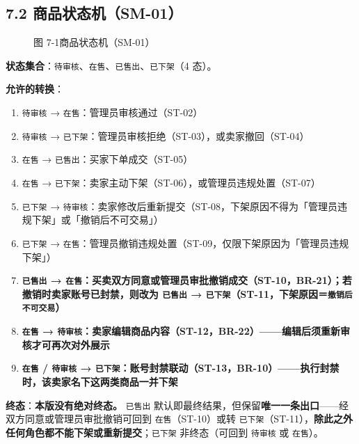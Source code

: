 \documentclass[12pt,a4paper]{ctexart}
\begin{document}
\subsection*{7.2 商品状态机（SM-01）}
\begin{figure}[htbp]
\centering
{}
\caption*{图 7-1\quad 商品状态机（SM-01）}
\label{fig:sm01}
\end{figure}


\textbf{状态集合}：\texttt{待审核}、\texttt{在售}、\texttt{已售出}、\texttt{已下架}（4 态）。


\textbf{允许的转换}：


\begin{enumerate}[leftmargin=1.9em,itemsep=1pt,topsep=2pt]
\item \texttt{待审核} → \texttt{在售}：管理员审核通过（ST-02）
\item \texttt{待审核} → \texttt{已下架}：管理员审核拒绝（ST-03），或卖家撤回（ST-04）
\item \texttt{在售} → \texttt{已售出}：买家下单成交（ST-05）
\item \texttt{在售} → \texttt{已下架}：卖家主动下架（ST-06），或管理员违规处置（ST-07）
\item \texttt{已下架} → \texttt{待审核}：卖家修改后重新提交（ST-08，下架原因不得为「管理员违规下架」或「撤销后不可交易」）
\item \texttt{已下架} → \texttt{在售}：管理员撤销违规处置（ST-09，仅限下架原因为「管理员违规下架」）
\item \textbf{\texttt{已售出} → \texttt{在售}：买卖双方同意或管理员审批撤销成交（ST-10，BR-21）；若撤销时卖家账号已封禁，则改为 \texttt{已售出} → \texttt{已下架}（ST-11，下架原因＝\texttt{撤销后不可交易}）}
\item \textbf{\texttt{在售} → \texttt{待审核}：卖家编辑商品内容（ST-12，BR-22）——编辑后须重新审核才可再次对外展示}
\item \textbf{\texttt{在售} / \texttt{待审核} → \texttt{已下架}：账号封禁联动（ST-13，BR-10）——执行封禁时，该卖家名下这两类商品一并下架}
\end{enumerate}

\textbf{终态}：\textbf{本版没有绝对终态。} \texttt{已售出} 默认即最终结果，但保留\textbf{唯一一条出口}——经双方同意或管理员审批撤销可回到 \texttt{在售}（ST-10）或转 \texttt{已下架}（ST-11），\textbf{除此之外任何角色都不能下架或重新提交}；\texttt{已下架} 非终态（可回到 \texttt{待审核} 或 \texttt{在售}）。
\end{document}
